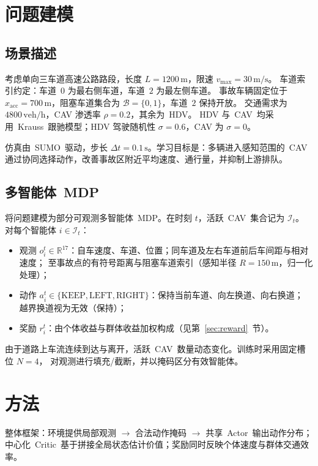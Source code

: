 \documentclass[UTF8,a4paper,11pt]{ctexart}
\begin{document}
\section{问题建模}

\subsection{场景描述}
考虑单向三车道高速公路路段，长度 $L=1200\,\mathrm{m}$，限速 $v_{\max}=30\,\mathrm{m/s}$。
车道索引约定：车道~$0$ 为最右侧车道，车道~$2$ 为最左侧车道。
事故车辆固定位于 $x_{\mathrm{acc}}=700\,\mathrm{m}$，阻塞车道集合为 $\mathcal B=\{0,1\}$，车道~$2$ 保持开放。
交通需求为 $4800\,\mathrm{veh/h}$，CAV 渗透率 $\rho=0.2$，其余为~HDV。
HDV 与~CAV~均采用~Krauss~跟驰模型；HDV 驾驶随机性 $\sigma=0.6$，CAV 为 $\sigma=0$。

仿真由~SUMO~驱动，步长 $\Delta t=0.1\,\mathrm{s}$。学习目标是：多辆进入感知范围的~CAV~
通过协同选择动作，改善事故区附近平均速度、通行量，并抑制上游排队。

\subsection{多智能体~MDP}
将问题建模为部分可观测多智能体~MDP。在时刻 $t$，活跃~CAV~集合记为 $\mathcal{I}_t$。
对每个智能体 $i\in\mathcal{I}_t$：
\begin{itemize}[leftmargin=2em]
  \item 观测 $o_i^t\in\mathbb{R}^{17}$：自车速度、车道、位置；同车道及左右车道前后车间距与相对速度；
        至事故点的有符号距离与阻塞车道索引（感知半径 $R=150\,\mathrm{m}$，归一化处理）；
  \item 动作 $a_i^t\in\{\mathrm{KEEP},\mathrm{LEFT},\mathrm{RIGHT}\}$：保持当前车道、向左换道、向右换道；
        越界换道视为无效（保持）；
  \item 奖励 $r_i^t$：由个体收益与群体收益加权构成（见第~\ref{sec:reward}~节）。
\end{itemize}

由于道路上车流连续到达与离开，活跃~CAV~数量动态变化。训练时采用固定槽位 $N=4$，
对观测进行填充/截断，并以掩码区分有效智能体。

\section{方法}
\label{sec:method}

整体框架：环境提供局部观测 $\to$ 合法动作掩码 $\to$ 共享~Actor~输出动作分布；
中心化~Critic~基于拼接全局状态估计价值；奖励同时反映个体速度与群体交通效率。
\end{document}
